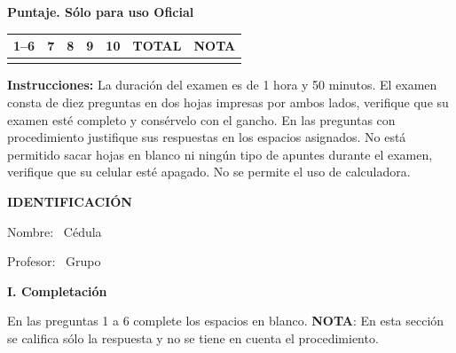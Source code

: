 \documentclass[11pt]{article}
\begin{document}
\examheader

\vspace{4pt}
\noindent
\begin{minipage}[t]{0.68\linewidth}
\textbf{Puntaje. Sólo para uso Oficial}\\[4pt]
\begin{tabular}{|c|c|c|c|c|c|c|}
\hline
1--6 & 7 & 8 & 9 & 10 & \textbf{TOTAL} & \textbf{NOTA} \\ \hline
 & & & & & & \\ \hline
\end{tabular}
\end{minipage}

\vspace{6pt}
\noindent\textbf{Instrucciones:} La duración del examen es de 1 hora y 50 minutos. El examen consta de diez preguntas en dos hojas impresas por ambos lados, verifique que su examen esté completo y consérvelo con el gancho. En las preguntas con procedimiento justifique sus respuestas en los espacios asignados. No está permitido sacar hojas en blanco ni ningún tipo de apuntes durante el examen, verifique que su celular esté apagado. No se permite el uso de calculadora.

\vspace{6pt}
\noindent\textbf{IDENTIFICACIÓN}

\vspace{8pt}
\noindent Nombre: \dotfill\ Cédula \dotfill

\vspace{4pt}
\noindent Profesor: \dotfill\ Grupo \dotfill

\vspace{10pt}
\begin{center}\textbf{I. Completación}\end{center}
\noindent En las preguntas 1 a 6 complete los espacios en blanco. \textbf{NOTA}: En esta sección se califica sólo la respuesta y no se tiene en cuenta el procedimiento.
\end{document}
